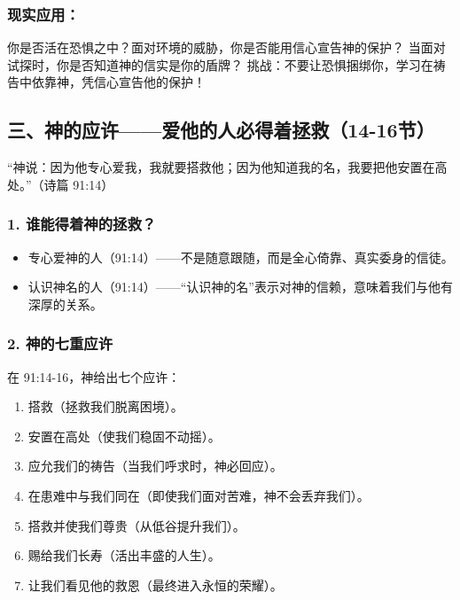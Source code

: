 \documentclass[a4paper, 12pt]{article}
\begin{document}
\subsubsection*{现实应用：}

你是否活在恐惧之中？面对环境的威胁，你是否能用信心宣告神的保护？
当面对试探时，你是否知道神的信实是你的盾牌？
挑战：不要让恐惧捆绑你，学习在祷告中依靠神，凭信心宣告他的保护！

\subsection*{三、神的应许——爱他的人必得着拯救（14-16节）}
“神说：因为他专心爱我，我就要搭救他；因为他知道我的名，我要把他安置在高处。”（诗篇 91:14）

\subsubsection*{1. 谁能得着神的拯救？}
\begin{itemize}
    \item 专心爱神的人（91:14）——不是随意跟随，而是全心倚靠、真实委身的信徒。

    \item 认识神名的人（91:14）——“认识神的名”表示对神的信赖，意味着我们与他有深厚的关系。

\end{itemize}
\subsubsection*{2. 神的七重应许}
在 91:14-16，神给出七个应许：
\begin{enumerate}
    \item 搭救（拯救我们脱离困境）。

    \item 安置在高处（使我们稳固不动摇）。

    \item 应允我们的祷告（当我们呼求时，神必回应）。

    \item 在患难中与我们同在（即使我们面对苦难，神不会丢弃我们）。

    \item 搭救并使我们尊贵（从低谷提升我们）。

    \item 赐给我们长寿（活出丰盛的人生）。

    \item 让我们看见他的救恩（最终进入永恒的荣耀）。

\end{enumerate}
\end{document}
